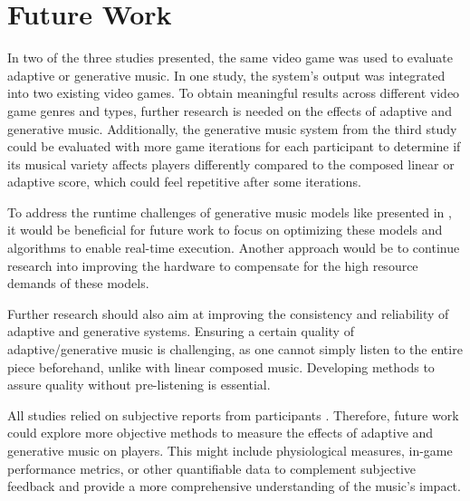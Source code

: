 \section{Future Work}

In two of the three studies presented, the same video game was used to evaluate adaptive or generative music. In one study, the system’s output was integrated into two existing video games. To obtain meaningful results across different video game genres and types, further research is needed on the effects of adaptive and generative music. Additionally, the generative music system from the third study could be evaluated with more game iterations for each participant to determine if its musical variety affects players differently compared to the composed linear or adaptive score, which could feel repetitive after some iterations.

To address the runtime challenges of generative music models like presented in \cite{plut2022preglam}, it would be beneficial for future work to focus on optimizing these models and algorithms to enable real-time execution. Another approach would be to continue research into improving the hardware to compensate for the high resource demands of these models.

Further research should also aim at improving the consistency and reliability of adaptive and generative systems. Ensuring a certain quality of adaptive/generative music is challenging, as one cannot simply listen to the entire piece beforehand, unlike with linear composed music. Developing methods to assure quality without pre-listening is essential.

All studies relied on subjective reports from participants \cite{amaral2022adaptive}\cite{hutMcCormAms}\cite{plut2022preglam}\cite{lopez2023progressive}. Therefore, future work could explore more objective methods to measure the effects of adaptive and generative music on players. This might include physiological measures, in-game performance metrics, or other quantifiable data to complement subjective feedback and provide a more comprehensive understanding of the music's impact.

